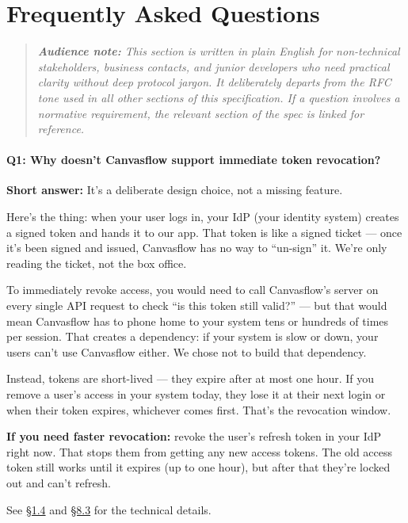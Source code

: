 
\section{Frequently Asked Questions}

\begin{quote}
\textit{\textbf{Audience note:} This section is written in plain English for
non-technical stakeholders, business contacts, and junior developers who need practical
clarity without deep protocol jargon. It deliberately departs from the RFC tone used in
all other sections of this specification. If a question involves a normative requirement,
the relevant section of the spec is linked for reference.}
\end{quote}

\paragraph{Q1: Why doesn't Canvasflow support immediate token revocation?}

\textbf{Short answer:} It's a deliberate design choice, not a missing feature.

Here's the thing: when your user logs in, your IdP (your identity system) creates a
signed token and hands it to our app. That token is like a signed ticket --- once it's
been signed and issued, Canvasflow has no way to ``un-sign'' it. We're only reading the
ticket, not the box office.

To immediately revoke access, you would need to call Canvasflow's server on every single
API request to check ``is this token still valid?'' --- but that would mean Canvasflow has
to phone home to your system tens or hundreds of times per session. That creates a
dependency: if your system is slow or down, your users can't use Canvasflow either. We
chose not to build that dependency.

Instead, tokens are short-lived --- they expire after at most one hour. If you remove a
user's access in your system today, they lose it at their next login or when their token
expires, whichever comes first. That's the revocation window.

\textbf{If you need faster revocation:} revoke the user's refresh token in your IdP
right now. That stops them from getting any new access tokens. The old access token still
works until it expires (up to one hour), but after that they're locked out and can't
refresh.



See \hyperref[sec:out-of-scope]{\S1.4} and \hyperref[sec:freshly-evaluated-entitlements]{\S8.3} for the technical details.

